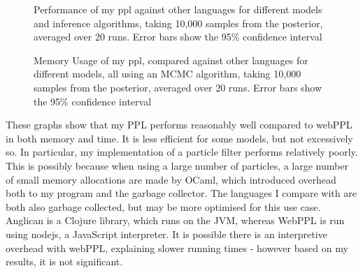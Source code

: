 \begin{figure}[!ht]
	\centering
																					
																					
	\caption{Performance of my ppl against other languages for different models and inference algorithms, taking 10,000 samples from the posterior, averaged over 20 runs. Error bars show the 95\% confidence interval}
	\label{fig:time-perf}
\end{figure}
			
\begin{figure}[!ht]
	\centering
																							
																							
																							
	\caption{Memory Usage of my ppl, compared against other languages for different models, all using an MCMC algorithm, taking 10,000 samples from the posterior, averaged over 20 runs. Error bars show the 95\% confidence interval}
	\label{fig:mem-perf}
\end{figure}
			
These graphs show that my PPL performs reasonably well compared to webPPL in both memory and time. It is less efficient for some models, but not excessively so. In particular, my implementation of a particle filter performs relatively poorly. This is possibly because when using a large number of particles, a large number of small memory allocations are made by OCaml, which introduced overhead both to my program and the garbage collector. The languages I compare with are both also garbage collected, but may be more optimised for this use case. Anglican is a Clojure library, which runs on the JVM, whereas WebPPL is run using nodejs, a JavaScript interpreter. It is possible there is an interpretive overhead with webPPL, explaining slower running times - however based on my results, it is not significant.
			
